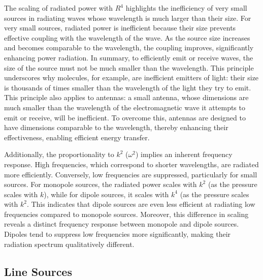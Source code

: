 \documentclass[a4paper]{article}
\begin{document}
The scaling of radiated power with \( R^4 \) highlights the inefficiency of very small sources in radiating waves whose wavelength is much larger than their size.  For very small sources, radiated power is inefficient because their size prevents effective coupling with the wavelength of the wave. As the source size increases and becomes comparable to the wavelength, the coupling improves, significantly enhancing power radiation. In summary, to efficiently emit or receive waves, the size of the source must not be much smaller than the wavelength. This principle underscores why molecules, for example, are inefficient emitters of light: their size is thousands of times smaller than the wavelength of the light they try to emit. This principle also applies to antennas: a small antenna, whose dimensions are much smaller than the wavelength of the electromagnetic wave it attempts to emit or receive, will be inefficient. To overcome this, antennas are designed to have dimensions comparable to the wavelength, thereby enhancing their effectiveness, enabling efficient energy transfer.

Additionally, the proportionality to \( k^2 \) (\( \omega^2 \)) implies an inherent frequency response. High frequencies, which correspond to shorter wavelengths, are radiated more efficiently. Conversely, low frequencies are suppressed, particularly for small sources. For monopole sources, the radiated power scales with \( k^2 \) (as the pressure scales with \( k \)), while for dipole sources, it scales with \( k^4 \) (as the pressure scales with \( k^2 \). This indicates that dipole sources are even less efficient at radiating low frequencies compared to monopole sources. Moreover, this difference in scaling reveals a distinct frequency response between monopole and dipole sources. Dipoles tend to suppress low frequencies more significantly, making their radiation spectrum qualitatively different.



\subsection{Line Sources}
\end{document}
